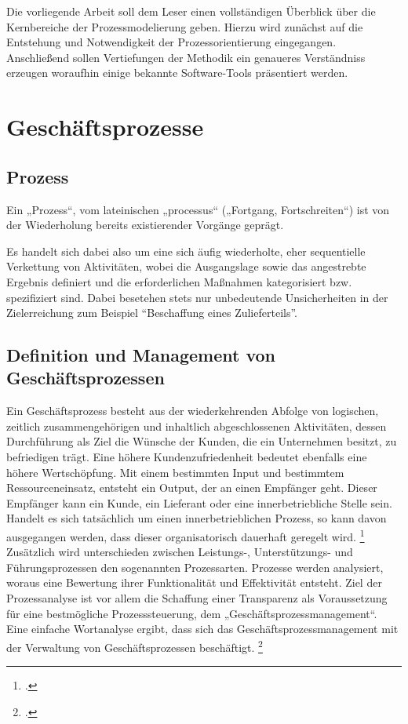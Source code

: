 Die vorliegende Arbeit soll dem Leser einen vollständigen Überblick über die
Kernbereiche der Prozessmodelierung geben. Hierzu wird zunächst auf die
Entstehung und Notwendigkeit der Prozessorientierung eingegangen. Anschließend
sollen Vertiefungen der Methodik ein genaueres Verständniss erzeugen woraufhin
einige bekannte Software-Tools präsentiert werden.

\clearpage
\section{Geschäftsprozesse}

\subsection{Prozess}


Ein „Prozess“, vom lateinischen „processus“ („Fortgang, Fortschreiten“) ist von
der Wiederholung bereits existierender Vorgänge geprägt.

Es handelt sich dabei also um eine sich äufig wiederholte, eher sequentielle
Verkettung von Aktivitäten, wobei die Ausgangslage sowie das
angestrebte Ergebnis definiert und die erforderlichen Maßnahmen
kategorisiert bzw. spezifiziert sind. Dabei besetehen stets nur
unbedeutende Unsicherheiten in der Zielerreichung zum Beispiel "`Beschaffung
eines Zulieferteils"'.

\subsection{Definition und Management von Geschäftsprozessen}


Ein Geschäftsprozess besteht aus der wiederkehrenden Abfolge von logischen,
zeitlich zusammengehörigen und inhaltlich abgeschlossenen Aktivitäten, dessen 
Durchführung als Ziel die Wünsche der Kunden, die ein Unternehmen besitzt, zu befriedigen trägt.
Eine höhere Kundenzufriedenheit bedeutet ebenfalls eine höhere Wertschöpfung. 
Mit einem bestimmten Input und bestimmtem Ressourceneinsatz, 
entsteht ein Output, der an einen Empfänger geht. 
Dieser Empfänger kann ein Kunde, ein Lieferant oder eine innerbetriebliche Stelle sein. 
Handelt es sich tatsächlich um einen innerbetrieblichen Prozess, 
so kann davon ausgegangen werden, dass dieser organisatorisch dauerhaft geregelt wird.
\footcite[Vgl.][ ]{prozess:db}\\



Zusätzlich wird unterschieden zwischen Leistungs-, Unterstützungs- und
Führungsprozessen den sogenannten Prozessarten. Prozesse werden analysiert, 
woraus eine Bewertung ihrer Funktionalität und Effektivität entsteht. 
Ziel der Prozessanalyse ist vor allem die Schaffung einer Transparenz als 
Voraussetzung für eine bestmögliche Prozesssteuerung, dem „Geschäftsprozessmanagement“. 
Eine einfache Wortanalyse ergibt, dass sich das Geschäftsprozessmanagement 
mit der Verwaltung von Geschäftsprozessen beschäftigt.
\footcite[S.13]{lehmann}\\

